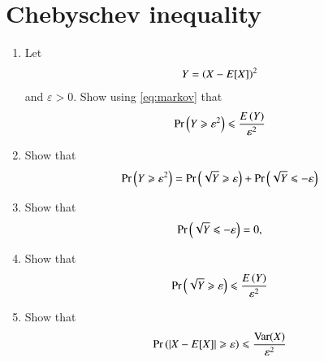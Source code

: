 \documentclass[journal,12pt,twocolumn]{IEEEtran}
\renewcommand\thesection{\arabic{section}}
\begin{document}
                                                                                                                                                                                                                                            \section{Chebyschev inequality} 
\begin{enumerate}[label=\thesection.\arabic*,ref=\thesection.\theenumi]
\item Let
\begin{align}
\label{eq:chebyschev_Y} 
Y = \left(X-E[X]\right)^2
 \end{align}
and $\varepsilon >0$.
Show using \eqref{eq:markov} that
\begin{align} 
 \Pr\left(Y\geqslant\varepsilon^2\right)\leqslant \frac{E\left(Y\right)}{\varepsilon^2}
 \end{align}
\item Show that
\begin{align} 
 \Pr\left(Y\geqslant\varepsilon^2\right)=\Pr\left(\sqrt{Y}\geqslant\varepsilon\right)+\Pr\left(\sqrt{Y}\leqslant-\varepsilon\right)
\label{eq:chebyschev_posneg}
 \end{align}
%
\item Show that
\begin{align}
\Pr\left(\sqrt{Y}\leqslant-\varepsilon\right) = 0,
 \end{align}
\item Show that 
\begin{align}
\Pr\left(\sqrt{Y}\geqslant\varepsilon\right)\leqslant \frac{E\left(Y\right)}{\varepsilon^2}
 \end{align}
\item Show that
\begin{align}
\label{eq:chebyschev}
 \Pr\left(\left\vert X-E[X]\right\vert\geqslant\varepsilon\right)\leqslant \frac{\text{Var}(X)}{\varepsilon^2}
 \end{align}
\end{enumerate}
\end{document}
